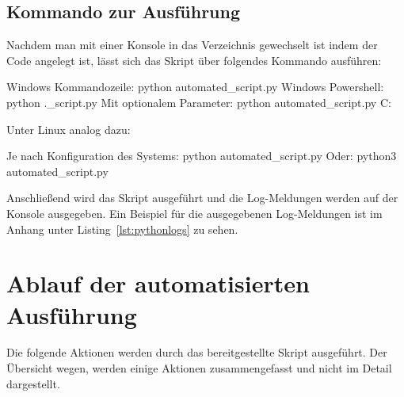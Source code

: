 \subsection{Kommando zur Ausführung}
Nachdem man mit einer Konsole in das Verzeichnis gewechselt ist indem der Code angelegt ist, lässt sich das Skript über folgendes Kommando ausführen:

{}{}

\begin{ExecuteCommandWindows}
Windows Kommandozeile:
	python automated_script.py
Windows Powershell:
	python .\automated\_script.py
Mit optionalem Parameter:
	python automated_script.py C:\Temp\sourcefolder
\end{ExecuteCommandWindows}

Unter Linux analog dazu:

{}{}

\begin{ExecuteCommandLinux}
Je nach Konfiguration des Systems:
	python automated_script.py
Oder:
	python3 automated_script.py
\end{ExecuteCommandLinux}

Anschließend wird das Skript ausgeführt und die Log-Meldungen werden auf der Konsole ausgegeben.
Ein Beispiel für die ausgegebenen Log-Meldungen ist im Anhang unter Listing~\ref{lst:pythonlogs} zu sehen.

\pagebreak
\section{Ablauf der automatisierten Ausführung}
Die folgende Aktionen werden durch das bereitgestellte Skript ausgeführt. 
Der Übersicht wegen, werden einige Aktionen zusammengefasst und nicht im Detail dargestellt.

